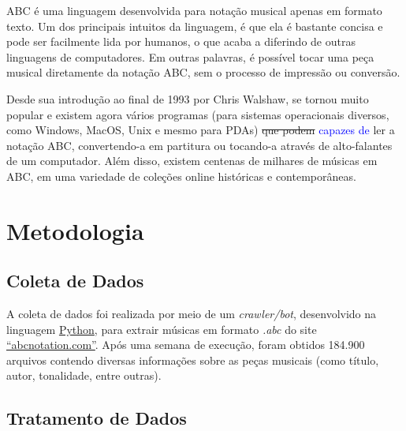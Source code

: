 \documentclass{automatextcc}
\newcommand{\pumi}[1]{\textcolor{blue}{#1}}
\begin{document}
ABC é uma linguagem desenvolvida para notação musical apenas em formato texto. Um dos principais intuitos da linguagem, é que ela é bastante concisa e pode ser facilmente lida por humanos,  o que acaba a diferindo de outras linguagens de computadores. Em outras palavras, é possível tocar uma peça musical diretamente da notação ABC, sem o processo de impressão ou conversão. 

Desde sua introdução ao final de 1993 por Chris Walshaw, se tornou muito popular e existem agora vários programas (para sistemas operacionais diversos, como Windows, MacOS, Unix e mesmo para PDAs) \sout{que podem} \pumi{capazes de} ler a notação ABC, convertendo-a em partitura ou tocando-a através de alto-falantes de um computador. Além disso, existem centenas de milhares de músicas em ABC, em uma variedade de coleções online históricas e contemporâneas.




\chapter{Metodologia}

\section{Coleta de Dados}


A coleta de dados foi realizada por meio de um \textit{crawler/bot}, desenvolvido na linguagem \href{https://python.org/}{Python}, para extrair músicas em formato \textit{.abc} do site \href{https://abcnotation.com/}{``abcnotation.com''}. Após uma semana de execução, foram obtidos 184.900 arquivos contendo diversas informações sobre as peças musicais (como título, autor, tonalidade, entre outras).

\section{Tratamento de Dados}
\end{document}
